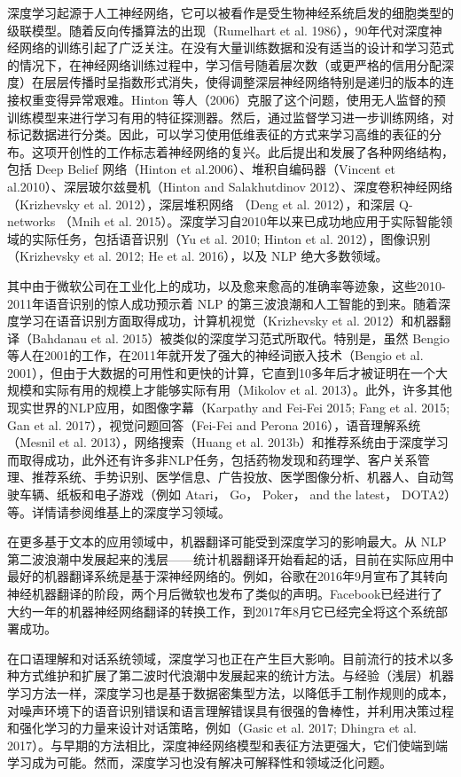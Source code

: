 深度学习起源于人工神经网络，它可以被看作是受生物神经系统启发的细胞类型的级联模型。随着反向传播算法的出现（Rumelhart
et al.
1986），90年代对深度神经网络的训练引起了广泛关注。在没有大量训练数据和没有适当的设计和学习范式的情况下，在神经网络训练过程中，学习信号随着层次数（或更严格的信用分配深度）在层层传播时呈指数形式消失，使得调整深层神经网络特别是递归的版本的连接权重变得异常艰难。Hinton
等人（2006）克服了这个问题，使用无人监督的预训练模型来进行学习有用的特征探测器。然后，通过监督学习进一步训练网络，对标记数据进行分类。因此，可以学习使用低维表征的方式来学习高维的表征的分布。这项开创性的工作标志着神经网络的复兴。此后提出和发展了各种网络结构，包括
Deep Belief 网络（Hinton et al.2006）、堆积自编码器（Vincent et
al.2010）、深层玻尔兹曼机（Hinton and Salakhutdinov
2012）、深度卷积神经网络（Krizhevsky et al. 2012），深层堆积网络 （Deng
et al. 2012），和深层 Q-networks （Mnih et al.
2015）。深度学习自2010年以来已成功地应用于实际智能领域的实际任务，包括语音识别（Yu
et al. 2010; Hinton et al. 2012），图像识别（Krizhevsky et al. 2012; He
et al. 2016），以及 NLP 绝大多数领域。

其中由于微软公司在工业化上的成功，以及愈来愈高的准确率等迹象，这些2010-2011年语音识别的惊人成功预示着
NLP
的第三波浪潮和人工智能的到来。随着深度学习在语音识别方面取得成功，计算机视觉（Krizhevsky
et al. 2012）和机器翻译（Bahdanau et al.
2015）被类似的深度学习范式所取代。特别是，虽然 Bengio
等人在2001的工作，在2011年就开发了强大的神经词嵌入技术（Bengio et al.
2001），但由于大数据的可用性和更快的计算，它直到10多年后才被证明在一个大规模和实际有用的规模上才能够实际有用（Mikolov
et al. 2013）。此外，许多其他现实世界的NLP应用，如图像字幕（Karpathy and
Fei-Fei 2015; Fang et al. 2015; Gan et al. 2017），视觉问题回答（Fei-Fei
and Perona 2016），语音理解系统（Mesnil et al. 2013），网络搜索（Huang
et al.
2013b）和推荐系统由于深度学习而取得成功，此外还有许多非NLP任务，包括药物发现和药理学、客户关系管理、推荐系统、手势识别、医学信息、广告投放、医学图像分析、机器人、自动驾驶车辆、纸板和电子游戏（例如
Atari， Go， Poker， and the latest，
DOTA2）等。详情请参阅维基上的深度学习领域。

在更多基于文本的应用领域中，机器翻译可能受到深度学习的影响最大。从 NLP
第二波浪潮中发展起来的浅层------统计机器翻译开始看起的话，目前在实际应用中最好的机器翻译系统是基于深神经网络的。例如，谷歌在2016年9月宣布了其转向神经机器翻译的阶段，两个月后微软也发布了类似的声明。Facebook已经进行了大约一年的机器神经网络翻译的转换工作，到2017年8月它已经完全将这个系统部署成功。

在口语理解和对话系统领域，深度学习也正在产生巨大影响。目前流行的技术以多种方式维护和扩展了第二波时代浪潮中发展起来的统计方法。与经验（浅层）机器学习方法一样，深度学习也是基于数据密集型方法，以降低手工制作规则的成本，对噪声环境下的语音识别错误和语言理解错误具有很强的鲁棒性，并利用决策过程和强化学习的力量来设计对话策略，例如（Gasic
et al. 2017; Dhingra et al.
2017）。与早期的方法相比，深度神经网络模型和表征方法更强大，它们使端到端学习成为可能。然而，深度学习也没有解决可解释性和领域泛化问题。

